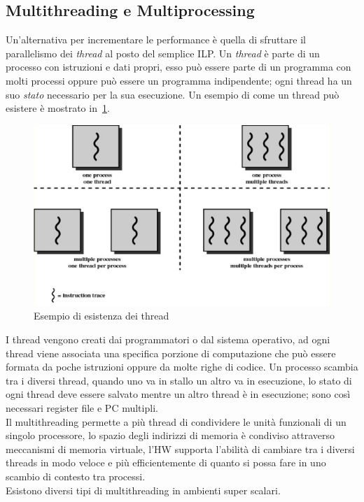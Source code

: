 \subsection{Multithreading e Multiprocessing}
Un'alternativa per incrementare le performance è quella di sfruttare il parallelismo dei \emph{thread} al posto del semplice ILP.
Un \emph{thread} è parte di un processo con istruzioni e dati propri, esso può essere parte di un programma con molti processi oppure può essere un programma indipendente; ogni thread ha un suo \emph{stato} necessario per la sua esecuzione. Un esempio di come un thread può esistere è mostrato in \figurename\,\ref{fig:threadproc}.
\begin{figure}[htb]
\centering
\includegraphics[scale=0.5]{img/threadproc.png}
\caption{Esempio di esistenza dei thread}\label{fig:threadproc}
\end{figure}
I thread vengono creati dai programmatori o dal sistema operativo, ad ogni thread viene associata una specifica porzione di computazione che può essere formata da poche istruzioni oppure da molte righe di codice. Un processo scambia tra i diversi thread, quando uno va in stallo un altro va in esecuzione, lo stato di ogni thread deve essere salvato mentre un altro thread è in esecuzione; sono così necessari register file e PC multipli.\\
Il multithreading permette a più thread di condividere le unità funzionali di un singolo processore, lo spazio degli indirizzi di memoria è condiviso attraverso meccanismi di memoria virtuale, l'HW supporta l'abilità di cambiare tra i diversi threads in modo veloce e più efficientemente di quanto si possa fare in uno scambio di contesto tra processi.\\
Esistono diversi tipi di multithreading in ambienti super scalari.
